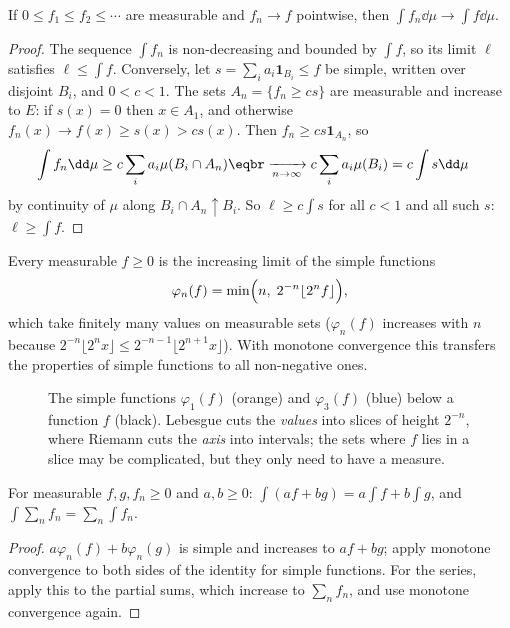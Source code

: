 \begin{theorem}\label{thm:mct}
If $0\le f_1\le f_2\le\cdots$ are measurable and $f_n\to f$ pointwise, then $\int f_n\dd\mu\to\int f\dd\mu$.
\end{theorem}
\begin{proof}
The sequence $\int f_n$ is non-decreasing and bounded by $\int f$, so its limit $\ell$ satisfies $\ell\le\int f$. Conversely, let
$s=\sum_ia_i\mathbf 1_{B_i}\le f$ be simple, written over disjoint $B_i$, and $0<c<1$. The sets $A_n=\{f_n\ge cs\}$ are measurable and increase
to $E$: if $s(x)=0$ then $x\in A_1$, and otherwise $f_n(x)\to f(x)\ge s(x)>cs(x)$. Then $f_n\ge cs\mathbf 1_{A_n}$, so
\[
\begin{aligned}\int f_n\dd\mu&\ge c\sum_ia_i\mu(B_i\cap A_n)\eqbr\xrightarrow[n\to\infty]{}c\sum_ia_i\mu(B_i)=c\int s\dd\mu\end{aligned}
\]
by continuity of $\mu$ along $B_i\cap A_n\uparrow B_i$. So $\ell\ge c\int s$ for all $c<1$ and all such $s$: $\ell\ge\int f$.
\end{proof}

Every measurable $f\ge0$ is the increasing limit of the simple functions
\[
\varphi_n(f)=\min\Bigl(n,\;2^{-n}\lfloor2^nf\rfloor\Bigr),
\]
which take finitely many values on measurable sets ($\varphi_n(f)$ increases with $n$ because $2^{-n}\lfloor2^nx\rfloor\le2^{-n-1}\lfloor2^{n+1}x\rfloor$). With
monotone convergence this transfers the properties of simple functions to all non-negative ones.

\begin{figure}[ht]
\centering
{}
\caption{The simple functions $\varphi_1(f)$ (orange) and $\varphi_3(f)$ (blue) below a function $f$ (black). Lebesgue cuts the \emph{values} into
slices of height $2^{-n}$, where Riemann cuts the \emph{axis} into intervals; the sets where $f$ lies in a slice may be complicated, but
they only need to have a measure.}
\label{fig:simple}
\end{figure}

\begin{corollary}\label{cor:linearity}
For measurable $f,g,f_n\ge0$ and $a,b\ge0$: $\int(af+bg)=a\int f+b\int g$, and $\int\sum_nf_n=\sum_n\int f_n$.
\end{corollary}
\begin{proof}
$a\varphi_n(f)+b\varphi_n(g)$ is simple and increases to $af+bg$; apply monotone convergence to both sides of the identity for simple
functions. For the series, apply this to the partial sums, which increase to $\sum_nf_n$, and use monotone convergence again.
\end{proof}

